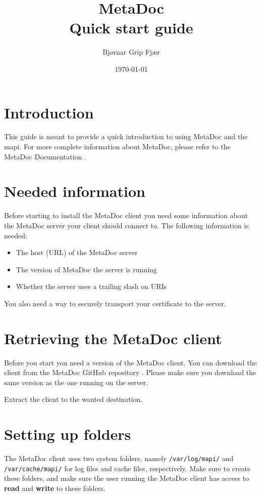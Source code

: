 \documentclass[titlepage, a4paper,10pt]{article}
\title{MetaDoc\\Quick start guide}
\author{Bjørnar Grip Fjær}
\date{\today}
\begin{document}
\maketitle

\section{Introduction}
This guide is meant to provide a quick introduction to using MetaDoc and the
\gls{mapi}. For more complete information about MetaDoc, please refer to the
MetaDoc Documentation \cite{mdoc}.

\section{Needed information}
Before starting to install the MetaDoc client you need some information about
the MetaDoc server your client should connect to. The following information is
needed:

\begin{itemize}
    \item
        The host (URL) of the MetaDoc server
    \item
        The version of MetaDoc the server is running
    \item
        Whether the server uses a trailing slash on URIs
\end{itemize}

You also need a way to securely transport your certificate to the server.

\section{Retrieving the MetaDoc client}
Before you start you need a version of the MetaDoc client. You can download the
client from the MetaDoc GitHub repository \cite{downloads}. Please make sure
you download the same version as the one running on the server. 

Extract the client to the wanted destination. 

\section{Setting up folders}
The MetaDoc client uses two system folders, namely \texttt{/var/log/mapi/} and
\\ \texttt{/var/cache/mapi/} for log files and cache files, respectively. Make
sure to create these folders, and make sure the user running the MetaDoc client
has access to \textbf{read} and \textbf{write} to these folders. 
\end{document}
